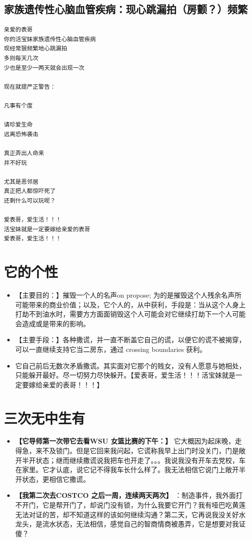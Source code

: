 \documentclass[9pt, b5paper]{article}
\begin{document}
\subsection{家族遗传性心脑血管疾病：现心跳漏拍（房颤？）频繁}
\label{sec-1-4}
\begin{verbatim}
亲爱的表哥
你的活宝妹家族遗传性心脑血管疾病
现经常狠频繁地心跳漏拍
多则每天几次
少也是至少一两天就会出现一次

现在就提严正警告：

凡事有个度

请珍爱生命
远离恐怖袭击

真正弄出人命来
并不好玩

尤其是恶邻居
真正把人都惊吓死了
还剩什么可以玩呢？

爱表哥，爱生活！！！
活宝妹就是一定要嫁给亲爱的表哥
爱表哥，爱生活！！！
\end{verbatim}

\section{它的个性}
\label{sec-2}
\begin{itemize}
\item 【主要目的：】摧毁一个人的名声on propose; 为的是摧毁这个人残余名声所可能带来的商业价值；以及，它个人的，从中获利，手段是：当从这个人身上打劫不到油水时，需要方方面面销毁这个人可能会对它继续打劫下一个人可能会造成或是带来的影响。
\item 【主要手段：】各种撒谎，并一直不断盖它自己的谎，以便它的谎不被揭穿，可以一直继续支持它当二房东，通过 crossing boundaries 获利。
\item 它自己前后无数次矛盾撒谎。其实面对它那个的贱女，没有人愿意与她相处，只能躲开最好。尽一切努力尽快躲开。【爱表哥，爱生活！！！活宝妹就是一定要嫁给亲爱的表哥！！！】
\end{itemize}
\section{三次无中生有}
\label{sec-3}
\begin{itemize}
\item \textbf{【它导师第一次带它去看WSU 女篮比赛的下午：】} 它大概因为起床晚，走得急，来不及锁门。但是它回来我问起，它谎称我早上出门时没关门，门是敞开半开状态；继而继续撒谎说我把车也开走了。。。我说我没有开车去党校，车在家里。它才认底，说它记不得我车长什么样了。我无法相信它说门上敞开半开状态，更相信它撒谎。
\item \textbf{【我第二次去COSTCO 之后一周，连续两天两次】} ：制造事件，我外面打不开门，它是帮开门了，却说门没有锁，为什么我要它开门？我有哑巴吃黄莲无法对证的苦，却不知道这样的该如何继续沟通？第二天，它再说我没关好水龙头，是流水状态，无法相信，感觉自己的智商情商被愚弄，它是想要对我证傻？
\end{itemize}
\end{document}
